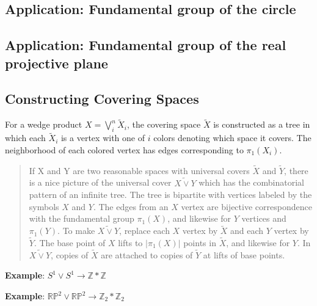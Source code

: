 \hypertarget{application-fundamental-group-of-the-circle}{%
\subsection{Application: Fundamental group of the
circle}\label{application-fundamental-group-of-the-circle}}

\hypertarget{application-fundamental-group-of-the-real-projective-plane}{%
\subsection{Application: Fundamental group of the real projective
plane}\label{application-fundamental-group-of-the-real-projective-plane}}

\hypertarget{constructing-covering-spaces}{%
\subsection{Constructing Covering
Spaces}\label{constructing-covering-spaces}}

For a wedge product \(X = \bigvee_i^n \tilde X_i\), the covering space
\(\tilde X\) is constructed as a tree in which each \(\tilde X_i\) is a
vertex with one of \(i\) colors denoting which space it covers. The
neighborhood of each colored vertex has edges corresponding to
\(\pi_1(X_i)\).

\begin{quote}
If X and Y are two reasonable spaces with universal covers \(\tilde X\)
and \(\tilde Y\), there is a nice picture of the universal cover
\(\widetilde{X\vee Y}\) which has the combinatorial pattern of an
infinite tree. The tree is bipartite with vertices labeled by the
symbols \(X\) and \(Y\). The edges from an \(X\) vertex are bijective
correspondence with the fundamental group \(\pi_1(X)\), and likewise for
\(Y\) vertices and \(\pi_1(Y)\). To make \(\widetilde{X\vee Y}\),
replace each \(X\) vertex by \(\tilde X\) and each \(Y\) vertex by
\(\tilde Y\). The base point of \(X\) lifts to
\({\left\lvert {\pi_1(X)} \right\rvert}\) points in \(\tilde X\), and
likewise for \(Y\). In \(\widetilde{X\vee Y}\), copies of \(\tilde X\)
are attached to copies of \(\tilde Y\) at lifts of base points.
\end{quote}

\textbf{Example}: \(S^1 \vee S^1 \to {\mathbb{Z}}\ast {\mathbb{Z}}\)

\textbf{Example}:
\({\mathbb{RP}}^2 \vee {\mathbb{RP}}^2 \to {\mathbb{Z}}_2 \ast {\mathbb{Z}}_2\)

